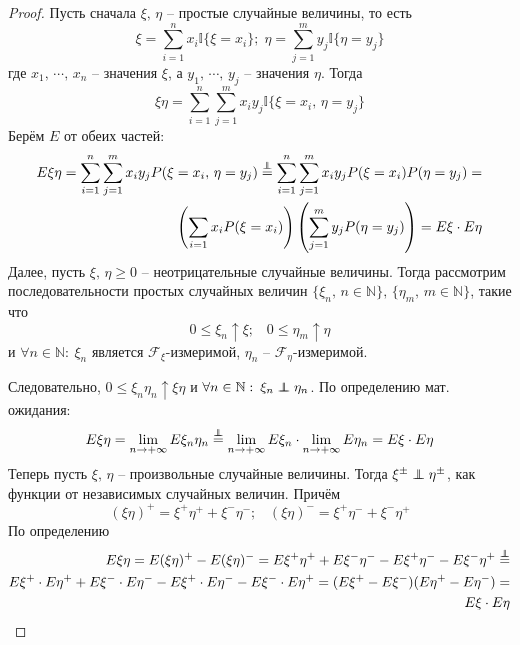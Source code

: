 \documentclass[a4paper,12pt]{article}
\renewcommand{\leq}{\ensuremath{\leqslant}}
\renewcommand{\geq}{\ensuremath{\geqslant}}
\newcommand\independent{\protect\mathpalette{\protect\independenT}{\perp}}
\def\independenT#1#2{\mathrel{\rlap{$#1#2$}\mkern2mu{#1#2}}}
\theoremstyle{plain}
\theoremstyle{definition}
\theoremstyle{remark}
\begin{document}
\begin{proof}
  Пусть сначала $\xi,\, \eta$ -- простые случайные величины, то есть
  \[\xi = \sum_{i = 1}^n x_i\mathbb{I}\{\xi = x_i\};\; \eta = \sum_{j = 1}^m y_j\mathbb{I}\{\eta = y_j\}\]
  где $x_1,\,\cdots,\,x_n$ -- значения $\xi$, а $y_1,\,\cdots,\,y_j$ -- значения $\eta$. Тогда
  \[\xi\eta = \sum_{i = 1}^n\sum_{j = 1}^m x_iy_j \mathbb{I}\{\xi = x_i,\, \eta = y_j\}\]
  Берём $E$ от обеих частей:
  \begin{align*}
    E\xi\eta = \sum_{i = 1}^n\sum_{j = 1}^m x_iy_j P(\xi = x_i,\, \eta = y_j) \stackrel{\independent}{=} \sum_{i = 1}^n\sum_{j = 1}^m x_iy_j P(\xi = x_i)P(\eta = y_j) = \\
    \left(\sum_{i = 1}x_iP(\xi = x_i)\right)\left(\sum_{j = 1}^my_jP(\eta = y_j)\right) = E\xi\cdot E\eta
  \end{align*}
  Далее, пусть $\xi,\,\eta \geq 0$ -- неотрицательные случайные величины. Тогда рассмотрим последовательности простых случайных величин $\{\xi_n,\, n \in \mathbb{N}\},\, \{\eta_m,\, m \in \mathbb{N}\}$, такие что
  \[0 \leq \xi_n \uparrow \xi ;\;\;\; 0 \leq \eta_m \uparrow \eta\]
  и $\forall n \in \mathbb{N}:\: \xi_n$ является $\mathcal{F}_\xi$-измеримой, $\eta_n$ -- $\mathcal{F}_\eta$-измеримой.

  Следовательно, $0 \leq \xi_n\eta_n \uparrow \xi\eta$ и $\forall n \in \mathbb{N}:\: \xi_n \independent \eta_n$. По определению мат. ожидания:
  \[E\xi\eta = \lim_{n \to +\infty} E\xi_n\eta_n \stackrel{\independent}{=} \lim_{n \to +\infty}E\xi_n\cdot \lim_{n \to +\infty}E\eta_n = E\xi\cdot E\eta\]
  Теперь пусть $\xi,\, \eta$ -- произвольные случайные величины. Тогда $\xi^\pm \independent \eta^\pm$, как функции от независимых случайных величин. Причём
  \[(\xi\eta)^+ = \xi^+\eta^+ + \xi^-\eta^- ;\;\;\; (\xi\eta)^- = \xi^+\eta^- + \xi^-\eta^+\]
  По определению
  \begin{align*}
    E\xi\eta = E(\xi\eta)^+ - E(\xi\eta)^- = E\xi^+\eta^+ + E\xi^-\eta^- - E\xi^+\eta^- - E\xi^-\eta^+ \stackrel{\independent}{=} \\
    E\xi^+\cdot E\eta^+ + E\xi^-\cdot E\eta^- - E\xi^+ \cdot E\eta^- - E\xi^-\cdot E\eta^+ = (E\xi^+ - E\xi^-)(E\eta^+ - E\eta^-) = \\
    E\xi \cdot E\eta
  \end{align*}
\end{proof}
\end{document}

